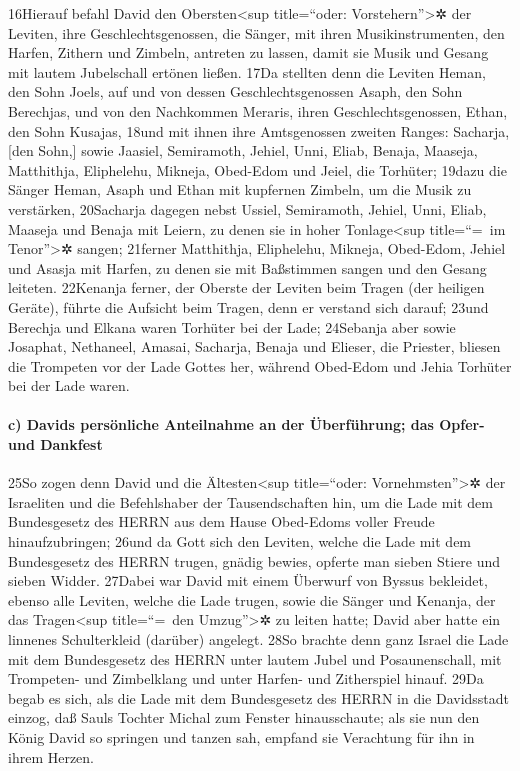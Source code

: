 16Hierauf befahl David den Obersten\textless sup title=``oder:
Vorstehern''\textgreater✲ der Leviten, ihre Geschlechtsgenossen, die
Sänger, mit ihren Musikinstrumenten, den Harfen, Zithern und Zimbeln,
antreten zu lassen, damit sie Musik und Gesang mit lautem Jubelschall
ertönen ließen. 17Da stellten denn die Leviten Heman, den Sohn Joels,
auf und von dessen Geschlechtsgenossen Asaph, den Sohn Berechjas, und
von den Nachkommen Meraris, ihren Geschlechtsgenossen, Ethan, den Sohn
Kusajas, 18und mit ihnen ihre Amtsgenossen zweiten Ranges: Sacharja,
{[}den Sohn,{]} sowie Jaasiel, Semiramoth, Jehiel, Unni, Eliab, Benaja,
Maaseja, Matthithja, Eliphelehu, Mikneja, Obed-Edom und Jeiel, die
Torhüter; 19dazu die Sänger Heman, Asaph und Ethan mit kupfernen
Zimbeln, um die Musik zu verstärken, 20Sacharja dagegen nebst Ussiel,
Semiramoth, Jehiel, Unni, Eliab, Maaseja und Benaja mit Leiern, zu denen
sie in hoher Tonlage\textless sup title=``=~im Tenor''\textgreater✲
sangen; 21ferner Matthithja, Eliphelehu, Mikneja, Obed-Edom, Jehiel und
Asasja mit Harfen, zu denen sie mit Baßstimmen sangen und den Gesang
leiteten. 22Kenanja ferner, der Oberste der Leviten beim Tragen (der
heiligen Geräte), führte die Aufsicht beim Tragen, denn er verstand sich
darauf; 23und Berechja und Elkana waren Torhüter bei der Lade; 24Sebanja
aber sowie Josaphat, Nethaneel, Amasai, Sacharja, Benaja und Elieser,
die Priester, bliesen die Trompeten vor der Lade Gottes her, während
Obed-Edom und Jehia Torhüter bei der Lade waren.

\hypertarget{c-davids-persuxf6nliche-anteilnahme-an-der-uxfcberfuxfchrung-das-opfer--und-dankfest}{%
\paragraph{c) Davids persönliche Anteilnahme an der Überführung; das
Opfer- und
Dankfest}\label{c-davids-persuxf6nliche-anteilnahme-an-der-uxfcberfuxfchrung-das-opfer--und-dankfest}}

25So zogen denn David und die Ältesten\textless sup title=``oder:
Vornehmsten''\textgreater✲ der Israeliten und die Befehlshaber der
Tausendschaften hin, um die Lade mit dem Bundesgesetz des HERRN aus dem
Hause Obed-Edoms voller Freude hinaufzubringen; 26und da Gott sich den
Leviten, welche die Lade mit dem Bundesgesetz des HERRN trugen, gnädig
bewies, opferte man sieben Stiere und sieben Widder. 27Dabei war David
mit einem Überwurf von Byssus bekleidet, ebenso alle Leviten, welche die
Lade trugen, sowie die Sänger und Kenanja, der das Tragen\textless sup
title=``=~den Umzug''\textgreater✲ zu leiten hatte; David aber hatte ein
linnenes Schulterkleid (darüber) angelegt. 28So brachte denn ganz Israel
die Lade mit dem Bundesgesetz des HERRN unter lautem Jubel und
Posaunenschall, mit Trompeten- und Zimbelklang und unter Harfen- und
Zitherspiel hinauf. 29Da begab es sich, als die Lade mit dem
Bundesgesetz des HERRN in die Davidsstadt einzog, daß Sauls Tochter
Michal zum Fenster hinausschaute; als sie nun den König David so
springen und tanzen sah, empfand sie Verachtung für ihn in ihrem Herzen.

